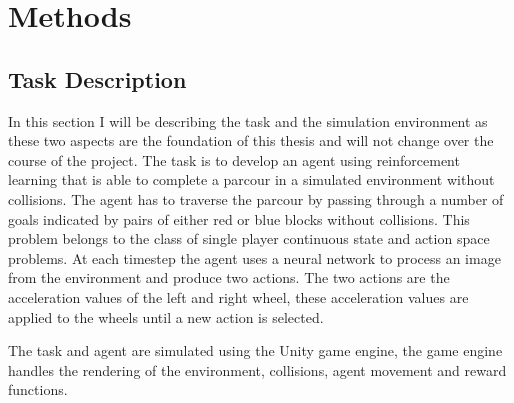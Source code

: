 \chapter{Methods}
\label{cha:Methods}



\section{Task Description}

In this section I will be describing the task and the simulation environment as these two aspects are the foundation of this thesis and will not change over the course of the project.
The task is to develop an agent using reinforcement learning that is able to complete a parcour in a simulated environment without collisions. The agent has to traverse the parcour by passing through a number of goals indicated by pairs of either red or blue blocks without collisions. This problem belongs to the class of single player continuous state and action space problems. At each timestep the agent uses a neural network to process an image from the environment and produce two actions. The two actions are the acceleration values of the left and right wheel, these acceleration values are applied to the wheels until a new action is selected.%

The task and agent are simulated using the Unity game engine, the game engine handles the rendering of the environment, collisions, agent movement and reward functions.


